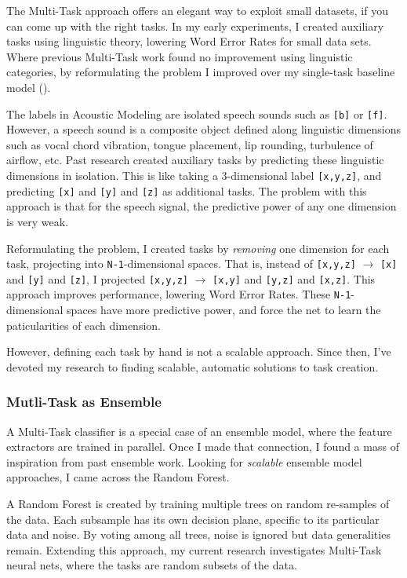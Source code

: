 \documentclass[12pt,a4paper]{article}
\begin{document}
The Multi-Task approach offers an elegant way to exploit small datasets, if you can come up with the right tasks. In my early experiments, I created auxiliary tasks using linguistic theory, lowering Word Error Rates for small data sets. Where previous Multi-Task work found no improvement using linguistic categories, by reformulating the problem I improved over my single-task baseline model ().

The labels in Acoustic Modeling are isolated speech sounds such as \texttt{[b]} or \texttt{[f]}. However, a speech sound is a composite object defined along linguistic dimensions such as vocal chord vibration, tongue placement, lip rounding, turbulence of airflow, etc. Past research created auxiliary tasks by predicting these linguistic dimensions in isolation. This is like taking a 3-dimensional label \texttt{[x,y,z]}, and predicting \texttt{[x]} and \texttt{[y]} and \texttt{[z]} as additional tasks. The problem with this approach is that for the speech signal, the predictive power of any one dimension is very weak.

Reformulating the problem, I created tasks by \textit{removing} one dimension for each task, projecting into \texttt{N-1}-dimensional spaces. That is, instead of \texttt{[x,y,z]} $\rightarrow$ \texttt{[x]} and \texttt{[y]} and \texttt{[z]}, I projected \texttt{[x,y,z]} $\rightarrow$ \texttt{[x,y]} and \texttt{[y,z]} and \texttt{[x,z]}. This approach improves performance, lowering Word Error Rates. These \texttt{N-1}-dimensional spaces have more predictive power, and force the net to learn the paticularities of each dimension.

However, defining each task by hand is not a scalable approach. Since then, I've devoted my research to finding scalable, automatic solutions to task creation.

\subsubsection*{Mutli-Task as Ensemble}

A Multi-Task classifier is a special case of an ensemble model, where the feature extractors are trained in parallel. Once I made that connection, I found a mass of inspiration from past ensemble work. Looking for \textit{scalable} ensemble model approaches, I came across the Random Forest.

A Random Forest is created by training multiple trees on random re-samples of the data. Each subsample has its own decision plane, specific to its particular data and noise. By voting among all trees, noise is ignored but data generalities remain. Extending this approach, my current research investigates Multi-Task neural nets, where the tasks are random subsets of the data.
\end{document}
